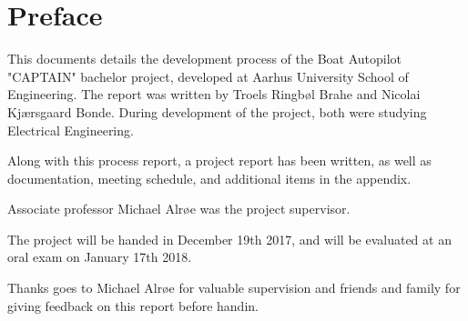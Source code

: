 \newpage
\chapter{Preface}
This documents details the development process of the Boat Autopilot "CAPTAIN" bachelor project, developed at Aarhus University School of Engineering. The report was written by Troels Ringbøl Brahe and Nicolai Kjærsgaard Bonde. During development of the project, both were studying Electrical Engineering.

Along with this process report, a project report has been written, as well as documentation, meeting schedule, and additional items in the appendix.

Associate professor Michael Alrøe was the project supervisor.

The project will be handed in December 19th 2017, and will be evaluated at an oral exam on January 17th 2018.

Thanks goes to Michael Alrøe for valuable supervision and friends and family for giving feedback on this report before handin.